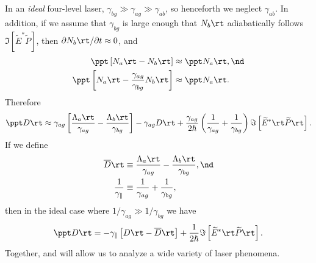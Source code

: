 In an \emph{ideal} four-level laser, $\gamma_{b g} \gg \gamma_{a g} \gg \gamma_{a b}$, so henceforth we neglect $\gamma_{a b}$. In addition, if we assume that $\gamma_{b g}$ is large enough that $N_b\rt$ adiabatically follows $\Im \left[ \widetilde{E}^\ast \widetilde{P} \right]$, then $\partial N_b\rt/\partial t \approx 0$, and
 \begin{align*}
\ppt \left[N_a\rt - N_b\rt\right] &\approx \ppt N_a\rt , \nd \\
\ppt \left[N_a\rt - \frac{\gamma_{a g}}{\gamma_{b g}} N_b\rt\right] &\approx \ppt N_a\rt .
 \end{align*}
Therefore
 \begin{equation*}
\ppt D\rt \approx \gamma_{a g} \left[\frac{\Lambda_a\rt}{\gamma_{a g}} - \frac{\Lambda_b\rt}{\gamma_{b g}}\right] - \gamma_{a g} D\rt + \frac{\gamma_{a g}}{2 \hslash} \left( \frac{1}{\gamma_{a g}} + \frac{1}{\gamma_{b g}} \right) \Im \left[ \widetilde{E}^\ast\rt \widetilde{P}\rt \right] .
 \end{equation*}
If we define
 \begin{align}
\label{eqn:fls_d0} \overline{D}\rt &\equiv \frac{\Lambda_a\rt}{\gamma_{a g}} - \frac{\Lambda_b\rt}{\gamma_{b g}} , \nd \\
\label{eqn:fls_gamma_para} \frac{1}{\gamma_\parallel} &\equiv \frac{1}{\gamma_{a g}} + \frac{1}{\gamma_{b g}} ,
 \end{align}
then in the ideal case where $1/\gamma_{a g} \gg 1/\gamma_{b g}$ we have
 \begin{equation}\label{eqn:fls_mbe_rwa_pop_diff}
\ppt D\rt = -\gamma_\parallel \left[ D\rt - \overline{D}\rt \right] + \frac{1}{2 \hslash} \Im \left[ \widetilde{E}^\ast\rt \widetilde{P}\rt \right] .
 \end{equation}
Together,  and  will allow us to analyze a wide variety of laser phenomena.

